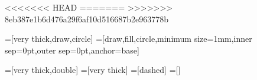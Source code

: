 <<<<<<< HEAD
%
%
%
%
%
%
=======
>>>>>>> 8eb387e1b6d476a29f6af10d516687b2e963778b

=[very thick,draw,circle]
=[draw,fill,circle,minimum size=1mm,inner sep=0pt,outer
  sep=0pt,anchor=base]
\newcommand{\nt}{\Large\bf} %
\newcommand{\ntm}{\LARGE} %
\newcommand{\pmt}{\Large} %

=[very thick,double]
=[very thick]
=[dashed]
=[]

\makeatletter

\def\preparelogo{
    \pgftext[center]{\raisebox{-0.75ex}{\ntm $\mathbf{\rho}$}}
}

\def\measlogo{
    \pgfpathmoveto{\pgfpoint{-0.3cm}{-0.2cm}}
    \pgfpathcurveto{\pgfpoint{-0.3cm}{0.1cm}}{\pgfpoint{0.3cm}{0.1cm}}{\pgfpoint{0.3cm}{-0.2cm}}
    \pgfpathmoveto{\pgfpoint{0cm}{-0.2cm}}
    \pgfpathlineto{\pgfpoint{0.2cm}{0.2cm}}
    \pgfpathmoveto{\pgfpoint{0.2cm}{0.2cm}}
    \pgfpathlineto{\pgfpoint{0.25cm}{0.1cm}}
    \pgfpathmoveto{\pgfpoint{0.2cm}{0.2cm}}
    \pgfpathlineto{\pgfpoint{0.1cm}{0.15cm}}
    \pgfsetlinewidth{0.9pt}
    \pgfusepath{stroke}
}

\def\siftlogo{
    \pgfpathmoveto{\pgfpoint{-0.2cm}{-0.1cm}}
    \pgfpathlineto{\pgfpoint{0.2cm}{-0.1cm}}
    \pgfpathmoveto{\pgfpoint{-0.2cm}{0.1cm}}
    \pgfpathlineto{\pgfpoint{0.2cm}{0.1cm}}
    \pgfsetlinewidth{1.2pt}
    \pgfusepath{stroke}
}

